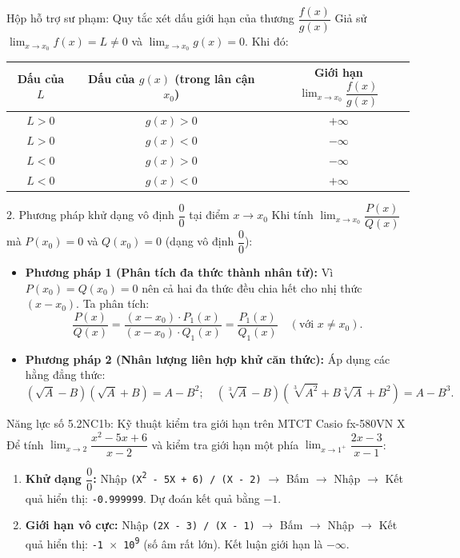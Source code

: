 \documentclass[12pt, a4paper]{article}
\begin{document}
\begin{scaffoldbox}{Hộp hỗ trợ sư phạm: Quy tắc xét dấu giới hạn của thương $\dfrac{f(x)}{g(x)}$}
Giả sử $\lim_{x \to x_0} f(x) = L \neq 0$ và $\lim_{x \to x_0} g(x) = 0$. Khi đó:
\begin{center}
\small
\begin{tabularx}{\textwidth}{|c|c|c|}
\hline
\textbf{Dấu của $L$} & \textbf{Dấu của $g(x)$ (trong lân cận $x_0$)} & \textbf{Giới hạn $\lim_{x \to x_0} \dfrac{f(x)}{g(x)}$} \\ \hline
$L > 0$ & $g(x) > 0$ & $+\infty$ \\ \hline
$L > 0$ & $g(x) < 0$ & $-\infty$ \\ \hline
$L < 0$ & $g(x) > 0$ & $-\infty$ \\ \hline
$L < 0$ & $g(x) < 0$ & $+\infty$ \\ \hline
\end{tabularx}
\end{center}
\end{scaffoldbox}

\begin{pedabox}{2. Phương pháp khử dạng vô định $\dfrac{0}{0}$ tại điểm $x \to x_0$}
Khi tính $\lim_{x \to x_0} \dfrac{P(x)}{Q(x)}$ mà $P(x_0) = 0$ và $Q(x_0) = 0$ (dạng vô định $\dfrac{0}{0}$):
\begin{itemize}[leftmargin=0.6cm]
    \item \textbf{Phương pháp 1 (Phân tích đa thức thành nhân tử):} Vì $P(x_0) = Q(x_0) = 0$ nên cả hai đa thức đều chia hết cho nhị thức $(x - x_0)$. Ta phân tích:
    $$\dfrac{P(x)}{Q(x)} = \dfrac{(x - x_0) \cdot P_1(x)}{(x - x_0) \cdot Q_1(x)} = \dfrac{P_1(x)}{Q_1(x)} \quad (\text{với } x \neq x_0).$$
    \item \textbf{Phương pháp 2 (Nhân lượng liên hợp khử căn thức):} Áp dụng các hằng đẳng thức:
    $$(\sqrt{A} - B)(\sqrt{A} + B) = A - B^2; \quad (\sqrt[3]{A} - B)(\sqrt[3]{A^2} + B\sqrt[3]{A} + B^2) = A - B^3.$$
\end{itemize}
\end{pedabox}

\begin{aibox}{Năng lực số 5.2NC1b: Kỹ thuật kiểm tra giới hạn trên MTCT Casio fx-580VN X}
Để tính $\lim_{x \to 2} \dfrac{x^2 - 5x + 6}{x - 2}$ và kiểm tra giới hạn một phía $\lim_{x \to 1^+} \dfrac{2x - 3}{x - 1}$:
\begin{enumerate}[leftmargin=0.6cm]
    \item \textbf{Khử dạng $\dfrac{0}{0}$:} Nhập \texttt{(X\textsuperscript{2} - 5X + 6) / (X - 2)} $\to$ Bấm  $\to$ Nhập  $\to$ Kết quả hiển thị: \texttt{-0.999999}. Dự đoán kết quả bằng $-1$.
    \item \textbf{Giới hạn vô cực:} Nhập \texttt{(2X - 3) / (X - 1)} $\to$ Bấm  $\to$ Nhập  $\to$ Kết quả hiển thị: \texttt{-1 $\times$ 10\textsuperscript{9}} (số âm rất lớn). Kết luận giới hạn là $-\infty$.
\end{enumerate}
\end{aibox}
\end{document}
